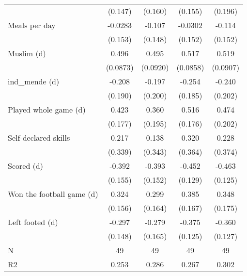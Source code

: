 {\begin{tabular}{l*{4}{c}}
                    &     (0.147)         &     (0.160)         &     (0.155)         &     (0.196)         \\
[1em]
Meals per day       &     -0.0283         &      -0.107         &     -0.0302         &      -0.114         \\
                    &     (0.153)         &     (0.148)         &     (0.152)         &     (0.152)         \\
[1em]
Muslim (d)          &       0.496\sym{***}&       0.495\sym{***}&       0.517\sym{***}&       0.519\sym{***}\\
                    &    (0.0873)         &    (0.0920)         &    (0.0858)         &    (0.0907)         \\
[1em]
ind\_mende (d)       &      -0.208         &      -0.197         &      -0.254         &      -0.240         \\
                    &     (0.190)         &     (0.200)         &     (0.185)         &     (0.202)         \\
[1em]
Played whole game (d)&       0.423\sym{**} &       0.360\sym{*}  &       0.516\sym{***}&       0.474\sym{**} \\
                    &     (0.177)         &     (0.195)         &     (0.176)         &     (0.202)         \\
[1em]
Self-declared skills&       0.217         &       0.138         &       0.320         &       0.228         \\
                    &     (0.339)         &     (0.343)         &     (0.364)         &     (0.374)         \\
[1em]
Scored (d)          &      -0.392\sym{**} &      -0.393\sym{***}&      -0.452\sym{***}&      -0.463\sym{***}\\
                    &     (0.155)         &     (0.152)         &     (0.129)         &     (0.125)         \\
[1em]
Won the football game (d)&       0.324\sym{**} &       0.299\sym{*}  &       0.385\sym{**} &       0.348\sym{**} \\
                    &     (0.156)         &     (0.164)         &     (0.167)         &     (0.175)         \\
[1em]
Left footed (d)     &      -0.297\sym{**} &      -0.279\sym{*}  &      -0.375\sym{***}&      -0.360\sym{***}\\
                    &     (0.148)         &     (0.165)         &     (0.125)         &     (0.127)         \\
\hline
N                   &          49         &          49         &          49         &          49         \\
R2                  &       0.253         &       0.286         &       0.267         &       0.302         \\
\hline\hline
\end{tabular}
}
